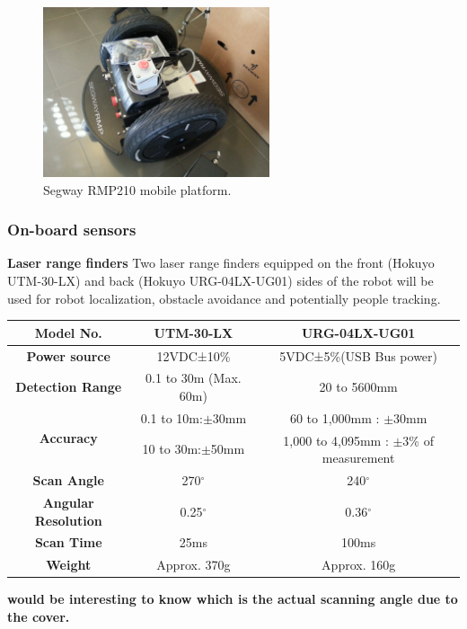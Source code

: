 \begin{figure}[h!]
\begin{center}
\includegraphics[height=5cm]{fig/segway_rmp210.jpg}
\end{center}
\caption{Segway RMP210 mobile platform.}
\label{fig:segway}
\end{figure}

\subsubsection{On-board sensors}

{\bf Laser range finders}
Two laser range finders equipped on the front (Hokuyo UTM-30-LX) and back (Hokuyo URG-04LX-UG01) sides of the robot will be used for robot localization, obstacle avoidance and potentially people tracking.

\begin{tabular}{|c|c|c|}
\hline
\bf{Model No.}& \bf{UTM-30-LX} & \bf{URG-04LX-UG01}\\
\hline
\bf{Power source} & 12VDC±10\% & 5VDC±5\%(USB Bus power)\\
\hline
\bf{Detection Range} & 0.1 to 30m (Max. 60m) & 20 to 5600mm\\
\hline
\multirow{2}{*}{\bf{Accuracy}}
 & 0.1 to 10m:$\pm$30mm  & 60 to 1,000mm : $\pm$30mm\\
 & 10 to 30m:$\pm$50mm & 1,000 to 4,095mm : $\pm$3\% of measurement\\
\hline
\bf{Scan Angle} & 270$^{\circ}$ & 240$^{\circ}$\\
\hline
\bf{Angular Resolution} & 0.25$^{\circ}$ & 0.36$^{\circ}$\\
\hline
\bf{Scan Time} & 25ms  & 100ms\\
\hline
\bf{Weight} & Approx. 370g  & Approx. 160g \\
\hline
\end{tabular}

{\bf would be interesting to know which is the actual scanning angle due to the cover.}


